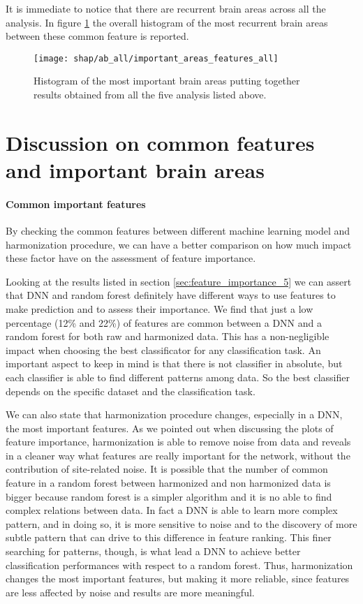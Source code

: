 \documentclass[11pt]{report}
\begin{document}
It is immediate to notice that there are recurrent brain areas across all the analysis.
In figure \ref{fig:important_areas_features_all} the overall histogram of the most recurrent brain areas between these common feature is reported.

\begin{figure}[h]
\centering
  \texttt{[image: shap/ab\_all/important\_areas\_features\_all]}
\caption{Histogram of the most important brain areas putting together results obtained from all the five analysis listed above.}
\label{fig:important_areas_features_all}
\end{figure}

\section{Discussion on common features and important brain areas}

\paragraph{Common important features}

\hfill

\noindent By checking the common features between different machine learning model and harmonization procedure, we can have a better comparison on how much impact these factor have on the assessment of feature importance.

Looking at the results listed in section \ref{sec:feature_importance_5} we can assert that DNN and random forest definitely have different ways to use features to make prediction and to assess their importance.
We find that just a low percentage (12\% and 22\%) of features are common between a DNN and a random forest for both raw and harmonized data.
This has a non-negligible impact when choosing the best classificator for any classification task.
An important aspect to keep in mind is that there is not  classifier in absolute, but each classifier is able to find different patterns among data.
So the best classifier depends on the specific dataset and the classification task.

We can also state that harmonization procedure changes, especially in a DNN, the most important features.
As we pointed out when discussing the plots of feature importance, harmonization is able to remove noise from data and reveals in a cleaner way what features are really important for the network, without the contribution of site-related noise.
It is possible that the number of common feature in a random forest between harmonized and non harmonized data is bigger because random forest is a simpler algorithm and it is no able to find complex relations between data.
In fact a DNN is able to learn more complex pattern, and in doing so, it is more sensitive to noise and to the discovery of more subtle pattern that can drive to this difference in feature ranking.
This finer searching for patterns, though, is what lead a DNN to achieve better classification performances with respect to a random forest.
Thus, harmonization changes the most important features, but making it more reliable, since features are less affected by noise and results are more meaningful.
\end{document}

